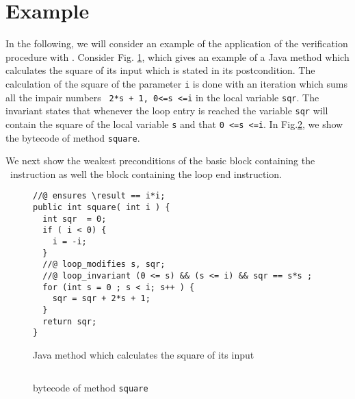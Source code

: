 \section{Example}\label{wp:example}
In the following, we will consider an example of the application of the verification procedure 
with \fwpi.
Consider Fig. \ref{wp:example:sqrSrc}, which gives an example of a Java method which calculates the square of its input which is stated in its postcondition.
The calculation of the square of the parameter  \lstinline!i!  is done with an iteration which sums all the impair numbers  \lstinline! 2*s + 1, 0<=s <=i! 
 in the local variable \lstinline!sqr!. The invariant states that whenever the loop entry is reached the variable 
  \lstinline!sqr! will contain the square of the local variable  \lstinline!s! and that \lstinline!0 <=s <=i!. 
In Fig.\ref{wp:example:sqrBc}, we show the bytecode of method \lstinline!square!. 


We next show the weakest preconditions of the basic block containing the 
\return \ instruction as well the block containing the loop end instruction. 



\begin{figure}
\begin{lstlisting}[frame=trbl]
//@ ensures \result == i*i; 
public int square( int i ) { 
  int sqr  = 0;
  if ( i < 0) {
    i = -i;
  }
  //@ loop_modifies s, sqr;
  //@ loop_invariant (0 <= s) && (s <= i) && sqr == s*s ;
  for (int s = 0 ; s < i; s++ ) {
    sqr = sqr + 2*s + 1;
  }
  return sqr;
}

\end{lstlisting} 
\caption{\sc Java method which calculates the square of its input  }
\label{wp:example:sqrSrc}
\end{figure}

\begin{figure}
\begin{lstlisting}[frame=trbl]

\end{lstlisting} 
\caption{\sc  bytecode of method \lstinline!square!}
\label{wp:example:sqrBc}
\end{figure}
